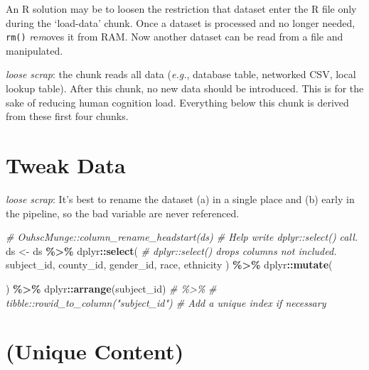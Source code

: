 \documentclass[
]{book}
\newenvironment{Shaded}{\begin{snugshade}}{\end{snugshade}}
\newcommand{\CommentTok}[1]{\textcolor[rgb]{0.56,0.35,0.01}{\textit{#1}}}
\newcommand{\KeywordTok}[1]{\textcolor[rgb]{0.13,0.29,0.53}{\textbf{#1}}}
\newcommand{\NormalTok}[1]{#1}
\newcommand{\OperatorTok}[1]{\textcolor[rgb]{0.81,0.36,0.00}{\textbf{#1}}}
\newcommand{\StringTok}[1]{\textcolor[rgb]{0.31,0.60,0.02}{#1}}
\begin{document}
An R solution may be to loosen the restriction that dataset enter the R file only during the `load-data' chunk. Once a dataset is processed and no longer needed, \texttt{rm()} \emph{r}e\emph{m}oves it from RAM. Now another dataset can be read from a file and manipulated.

\emph{loose scrap}:
the chunk reads all data (\emph{e.g.}, database table, networked CSV, local lookup table). After this chunk, no new data should be introduced. This is for the sake of reducing human cognition load. Everything below this chunk is derived from these first four chunks.

\hypertarget{chunk-tweak-data}{%
\section{Tweak Data}\label{chunk-tweak-data}}

\emph{loose scrap}:
It's best to rename the dataset (a) in a single place and (b) early in the pipeline, so the bad variable are never referenced.

\begin{Shaded}
\begin{Highlighting}[]
\CommentTok{\# OuhscMunge::column\_rename\_headstart(ds) \# Help write \textasciigrave{}dplyr::select()\textasciigrave{} call.}
\NormalTok{ds \textless{}{-}}
\StringTok{  }\NormalTok{ds }\OperatorTok{\%\textgreater{}\%}
\StringTok{  }\NormalTok{dplyr}\OperatorTok{::}\KeywordTok{select}\NormalTok{(    }\CommentTok{\# \textasciigrave{}dplyr::select()\textasciigrave{} drops columns not included.}
\NormalTok{    subject\_id,}
\NormalTok{    county\_id,}
\NormalTok{    gender\_id,}
\NormalTok{    race,}
\NormalTok{    ethnicity}
\NormalTok{  ) }\OperatorTok{\%\textgreater{}\%}
\StringTok{  }\NormalTok{dplyr}\OperatorTok{::}\KeywordTok{mutate}\NormalTok{(}

\NormalTok{  ) }\OperatorTok{\%\textgreater{}\%}
\StringTok{  }\NormalTok{dplyr}\OperatorTok{::}\KeywordTok{arrange}\NormalTok{(subject\_id) }\CommentTok{\# \%\textgreater{}\%}
  \CommentTok{\# tibble::rowid\_to\_column("subject\_id") \# Add a unique index if necessary}
\end{Highlighting}
\end{Shaded}

\hypertarget{chunk-unique}{%
\section{(Unique Content)}\label{chunk-unique}}
\end{document}
